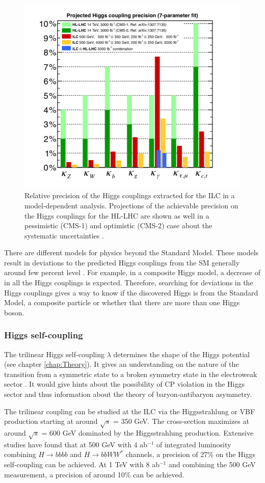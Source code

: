 \begin{figure}[htbp]
  \centering
  \includegraphics[width=0.7\linewidth]{chap2/fig/HiggsCouplings_LHCComp.png}
  \caption{Relative precision of the Higgs couplings extracted for the ILC in a model-dependent analysis. Projections of the achievable precision on the Higgs couplings for the HL-LHC are shown as well in a pessimistic (CMS-1) and optimistic (CMS-2) case about the systematic uncertainties \cite{Fujii:2015jha}.}  \label{fig:HiggsCouplings}
\end{figure}

There are different models for physics beyond the Standard Model. These models result in deviations to the predicted Higgs couplings from the SM generally around few percent level \cite{Gupta:2012mi}. For example, in a composite Higgs model, a decrease of in all the Higgs couplings is expected. Therefore, searching for deviations in the Higgs couplings gives a way to know if the discovered Higgs is from the Standard Model, a composite particle or whether that there are more than one Higgs boson.

\subsubsection{Higgs self-coupling}

The trilinear Higgs self-coupling $\lambda$ determines the shape of the Higgs potential (see chapter \ref{chap:Theory}). It gives an understanding on the nature of the transition from a symmetric state to a broken symmetry state in the electroweak sector \cite{Kajantie:1996mn}. It would give hints about the possibility of CP violation in the Higgs sector and thus information about the theory of baryon-antibaryon asymmetry.

The trilinear coupling can be studied at the ILC via the Higgsstrahlung or VBF production starting at around $\sqrt{s}$ = 350 GeV. The cross-section maximizes at around $\sqrt{s}$ = 600 GeV dominated by the Higgsstrahlung production. Extensive studies \cite{Duerig:2016dvi, Tian:2013qmi} have found that at 500 GeV with 4 ab$^{-1}$ of integrated luminosity combining $H \rightarrow bbbb$ and $H \rightarrow bbWW^*$ channels, a precision of 27\% on the Higgs self-coupling can be achieved. At 1 TeV with 8 ab$^{-1}$ and combining the 500 GeV measurement, a precision of around 10\% can be achieved.

